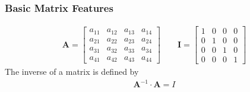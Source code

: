 \documentclass[letterpaper,10pt,english]{sphinxmanual}
\begin{document}
\subsubsection{Basic Matrix Features}
\label{\detokenize{chapter2:basic-matrix-features}}
\begin{equation*}
\begin{split}
\mathbf{A} =
      \begin{bmatrix} a_{11} & a_{12} & a_{13} & a_{14} \\
                                 a_{21} & a_{22} & a_{23} & a_{24} \\
                                   a_{31} & a_{32} & a_{33} & a_{34} \\
                                  a_{41} & a_{42} & a_{43} & a_{44}
             \end{bmatrix}\qquad
\mathbf{I} =
      \begin{bmatrix} 1 & 0 & 0 & 0 \\
                                 0 & 1 & 0 & 0 \\
                                 0 & 0 & 1 & 0 \\
                                 0 & 0 & 0 & 1
             \end{bmatrix}
\end{split}
\end{equation*}
The inverse of a matrix is defined by
\begin{equation*}
\begin{split}
\mathbf{A}^{-1} \cdot \mathbf{A} = I
\end{split}
\end{equation*}
\end{document}
